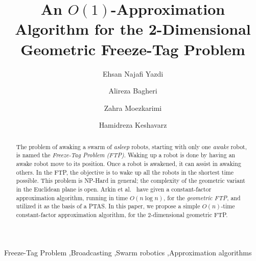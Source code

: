 \documentclass[review]{elsarticle}
\begin{document}
\begin{frontmatter}

\title{An $O(1)$-Approximation Algorithm for the 2-Dimensional Geometric Freeze-Tag Problem}

\author[aut]{Ehsan Najafi Yazdi}
\author[aut,iau]{Alireza Bagheri}
\author[aut]{Zahra Moezkarimi}
\author[tmu]{Hamidreza Keshavarz}

\address[aut]{Computer Engineering and Information Technology Department, Amirkabir University of Technology, Tehran, Iran}
\address[iau]{Computer Engineering Department, Tehran North Branch, Islamic Azad University, Tehran, Iran}
\address[tmu]{Faculty of Electrical and Computer Engineering, Tarbiat Modares University, Tehran, Iran}

\begin{abstract}
The problem of awaking a swarm of \textit{asleep} robots, starting with only one \textit{awake} robot, is named the \textit{Freeze-Tag Problem (FTP)}. Waking up a robot is done by having an awake robot move to its position. Once a robot is awakened, it can assist in awaking others. In the FTP, the objective is to wake up all the robots in the shortest time possible.
This problem is NP-Hard in general; the complexity of the geometric variant in the Euclidean plane is open.
Arkin et al.~\cite{Arkin2006} have given a constant-factor approximation algorithm, running in time $O(n\log n)$, for the \textit{geometric FTP}, and utilized it as the basis of a PTAS. In this paper, we propose a simple $O(n)$-time constant-factor approximation algorithm, for the 2-dimensional geometric FTP.
\end{abstract}

\begin{keyword}
Freeze-Tag Problem \sep Broadcasting \sep Swarm robotics \sep Approximation algorithms
\end{keyword}

\end{frontmatter}

\linenumbers
\end{document}
